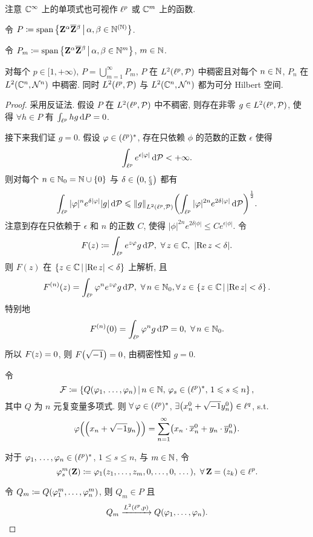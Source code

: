 注意 $\mathbb{C}^\infty$ 上的单项式也可视作 $\ell^p$ 或 $\mathbb{C}^m$ 上的函数.\par
令 $P\coloneqq\mathrm{span}\left\{\mathbf{Z}^\alpha\overline{\mathbf{Z}}{}^\beta\,\middle\vert\,\alpha,\beta\in\mathbb{N}^{\left(\mathbb{N}\right)}\right\}$.\par
令 $P_m\coloneqq\mathrm{span}\left\{\mathbf{Z}^\alpha\overline{\mathbf{Z}}{}^\beta\,\middle\vert\,\alpha,\beta\in\mathbb{N}^m\right\}$, $m\in\mathbb{N}$.
\begin{proposition}
对每个 $p\in[1,+\infty)$, $P=\bigcup_{m=1}^\infty P_m$, $P$ 在 $L^2\xk{\lp,\PP}$ 中稠密且对每个 $n\in\mathbb{N}$, $P_n$ 在 $L^2\xk{\cc^n,\mathcal{N}^n}$ 中稠密. 同时 $L^2\xk{\lp,\PP}$ 与 $L^2\xk{\cc^n,\mathcal{N}^n}$ 都为可分 Hilbert 空间.
\end{proposition}
\begin{proof}
采用反证法. 假设 $P$ 在 $L^2(\ell^p,\mathcal{P})$ 中不稠密, 则存在非零 $g\in L^2\xk{\lp,\PP}$, 使得 $\forall h\in P$ 有 $\int_{\ell^p} hg\,\mathrm{d} P=0$.\par
接下来我们证 $g=0$. 假设 $\varphi\in(\ell^p)^*$, 存在只依赖 $\phi$ 的范数的正数 $\epsilon$ 使得
\[\int_{\ell^p} e^{\epsilon|\varphi|}\,\mathrm{d} \mathcal{P}<+\infty.\]
则对每个 $n\in\mathbb{N}_0=\mathbb{N}\cup\left\{0\right\}$ 与 $\delta\in\left(0,\frac{\epsilon}{3}\right)$ 都有
\[\int_{\lp} |\phi|^n e^{\delta|\phi|}|g|\dd \PP\leq\fs{g}_{L^2\xk{\lp,\PP}}\xk{\int_{\lp} |\phi|^{2n} e^{2\delta|\phi|}\dd \PP}^\frac{1}{2}.\]
注意到存在只依赖于 $\epsilon$ 和 $n$ 的正数 $C$, 使得 $|\phi|^{2n}e^{2\delta|\phi|}\leq C e^{\epsilon|\phi|}$.
令
\[F(z)\dy\int_{\lp}e^{z\phi}g\dd \PP,\ \forall z\in\cc,\ |\re z<\delta|.\]
则 $F(z)$ 在 $\left\{z\in\mathbb{C}\,\middle\vert\,|\mathrm{Re}\, z|<\delta\right\}$ 上解析, 且
\[F^{(n)}(z)=\int_{\lp}\phi^n e^{z\phi}g\dd \PP,\ \forall n\in\nn_0,\forall z\in\jh{z\in\cc}{|\re z|<\delta}.\]
特别地
\[F^{\xk{n}}\xk{0}=\int_{\lp}\phi^n g\dd \PP=0,\ \forall n\in\nn_0.\]

所以 $F\xk{z}=0$, 则 $F\xk{\xs}=0$, 由稠密性知 $g=0$.\par
令
\[\mathcal{F}\dy\jh{Q\xk{\phi_1,\,\dots,\phi_n}}{n\in\nn,\,\phi_s\in\colp,\,1\leq s\leq n},\]
其中 $Q$ 为 $n$ 元复变量多项式. 则 $\forall\phi\in\colp$, $\exists\xk{x_n^0+\xs y_n^0}\in\ell^q$, s.t.
\[\phi\xk{\xk{x_n+\xs y_n}}=\sum_{n=1}^\infty\xk{x_n\cdot \mean{x}{}_n^0+y_n\cdot \mean{y}{}_n^0}.\]

对于 $\varphi_1,\,\dots,\varphi_n\in(\ell^p)^*$, $1\leq s\leq n$, 与 $m\in\mathbb{N}$, 令
\[\phi^m_s(\mathbf{Z})\dy\phi_1(z_1,\dots,z_m,0,\dots,0,\,\dotsc),\ \forall\mathbf{Z}=\xk{z_k}\in\lp.\]

令 $Q_m\dy Q\xk{\phi_1^m,\dots,\phi_n^m}$, 则 $Q_m\in P$ 且
\begin{equation*}
Q_m\xrightarrow{L^2(\ell^p,p)}Q(\varphi_1,\dots,\varphi_n).\qedhere
\end{equation*}
\end{proof}
